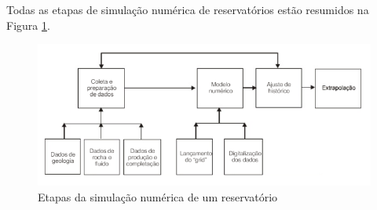 Todas as etapas de simula\c{c}\~{a}o num\'{e}rica de reservat\'{o}rios est\~{a}o resumidos na Figura \ref{fig:revisao_simsec2}.

\begin{figure}[!ht]
	\centering
	\includegraphics[width=.75\textwidth]{figs/revisao/revisao_simsec2}
	\caption{Etapas da simula\c{c}\~{a}o num\'{e}rica de um reservat\'{o}rio \cite[p. 523]{engres}}
	\label{fig:revisao_simsec2}
\end{figure}
